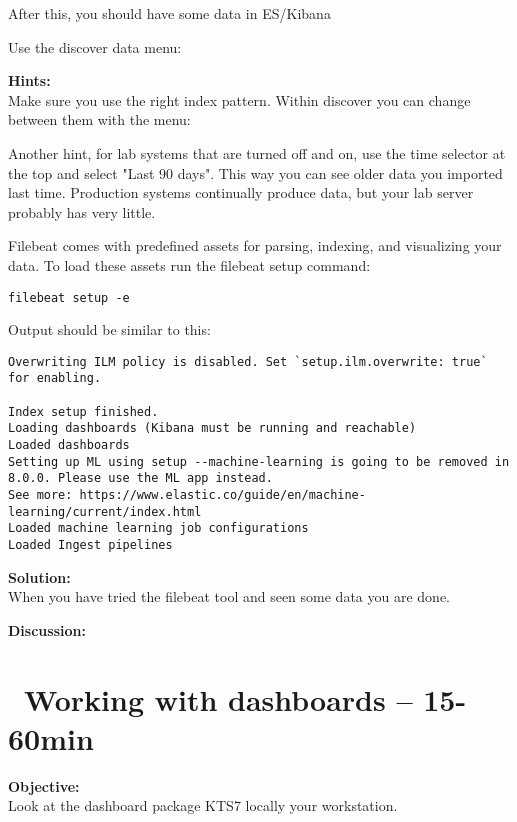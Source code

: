 \documentclass[a4paper,11pt,notitlepage]{report}
\begin{document}
After this, you should have some data in ES/Kibana

Use the discover data menu:


{\bf Hints:}\\
Make sure you use the right index pattern. Within discover you can change between them with the menu:


Another hint, for lab systems that are turned off and on, use the time selector at the top and select "Last 90 days". This way you can see older data you imported last time. Production systems continually produce data, but your lab server probably has very little.


Filebeat comes with predefined assets for parsing, indexing, and visualizing your data. To load these assets run the filebeat setup command:

\begin{verbatim}
filebeat setup -e
\end{verbatim}

Output should be similar to this:
\begin{verbatim}
Overwriting ILM policy is disabled. Set `setup.ilm.overwrite: true` for enabling.

Index setup finished.
Loading dashboards (Kibana must be running and reachable)
Loaded dashboards
Setting up ML using setup --machine-learning is going to be removed in 8.0.0. Please use the ML app instead.
See more: https://www.elastic.co/guide/en/machine-learning/current/index.html
Loaded machine learning job configurations
Loaded Ingest pipelines
\end{verbatim}


{\bf Solution:}\\
When you have tried the filebeat tool and seen some data you are done.

{\bf Discussion:}\\


\chapter{\faInfoCircle\ Working with dashboards -- 15-60min}
\label{ex:kibana-kts}

{\bf Objective:}\\

Look at the dashboard package KTS7 locally your workstation.
\end{document}
